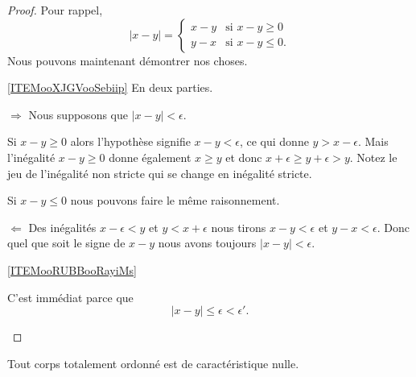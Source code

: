\begin{proof}
    Pour rappel,
    \begin{equation}
        | x-y |=\begin{cases}
               x-y    &     \text{si } x-y\geq 0 \\
                    y-x    &    \text{si } x-y\leq 0.
               \end{cases}
    \end{equation}
    Nous pouvons maintenant démontrer nos choses.
    \begin{subproof}
        \item[\ref{ITEMooXJGVooSebiip}]
            En deux parties.
            \begin{subproof}
            \item[\( \Rightarrow\)]
            Nous supposons que \( | x-y |<\epsilon\).

            Si \( x-y\geq 0\) alors l'hypothèse signifie \( x-y<\epsilon\), ce qui donne \( y>x-\epsilon\). Mais l'inégalité \( x-y\geq 0\) donne également \( x\geq y\) et donc \( x+\epsilon\geq y+\epsilon>y\). Notez le jeu de l'inégalité non stricte qui se change en inégalité stricte.

            Si \( x-y\leq 0\) nous pouvons faire le même raisonnement.

            \item[\( \Leftarrow\)]
            Des inégalités \( x-\epsilon<y\) et \( y<x+\epsilon\) nous tirons \( x-y<\epsilon\) et \( y-x<\epsilon\). Donc quel que soit le signe de \( x-y\) nous avons toujours \( | x-y |<\epsilon\).
            \end{subproof}

        \item[\ref{ITEMooRUBBooRayiMs}]

            C'est immédiat parce que
            \begin{equation}
                | x-y |\leq \epsilon<\epsilon'.
            \end{equation}
    \end{subproof}
\end{proof}


\begin{lemma}       \label{LEMooVZNCooRJatKK}
    Tout corps totalement ordonné est de caractéristique nulle.
\end{lemma}

